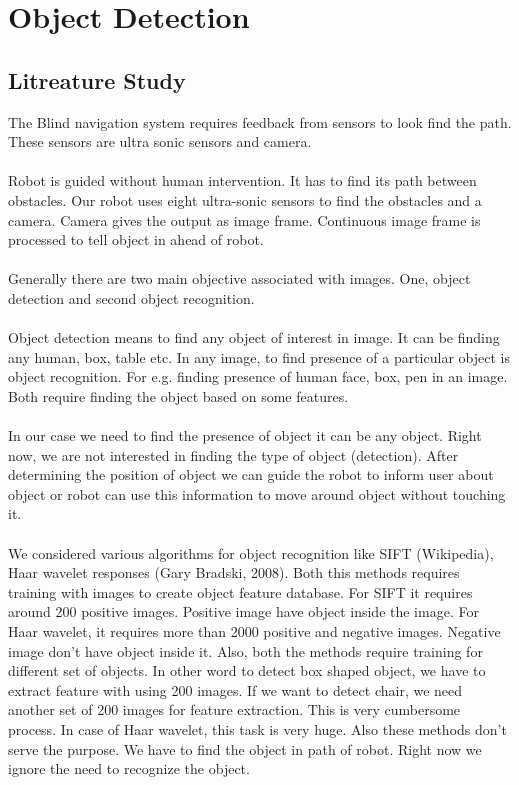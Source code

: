 \documentclass[12pt]{article}
\begin{document}
\section{Object Detection}
\subsection{Litreature Study}
The Blind navigation system requires feedback from sensors to look find the path. These sensors are ultra sonic sensors and camera.\\
\\
Robot is guided without human intervention. It has to find its path between obstacles. Our robot uses eight ultra-sonic sensors to find the obstacles and a camera. Camera gives the output as image frame. Continuous image frame is processed to tell object in ahead of robot.\\
\\
Generally there are two main objective associated with images. One, object detection and second object recognition.\\
\\
Object detection means to find any object of interest in image. It can be finding any human, box, table etc. In any image, to find presence of a particular object is object recognition. For e.g. finding presence of human face, box, pen in an image. Both require finding the object based on some features.\\
\\
In our case we need to find the presence of object it can be any object. Right now, we are not interested in finding the type of object (detection). After determining the position of object we can guide the robot to inform user about object or robot can use this information to move around object without touching it.\\
\\
We considered various algorithms for object recognition like SIFT (Wikipedia), Haar wavelet responses (Gary Bradski, 2008). Both this methods requires training with images to create object feature database. For SIFT it requires around 200 positive images. Positive image have object inside the image. For Haar wavelet, it requires more than 2000 positive and negative images. Negative image don't have object inside it. Also, both the methods require training for different set of objects. In other word to detect box shaped object, we have to extract feature with using 200 images. If we want to detect chair, we need another set of 200 images for feature extraction. This is very cumbersome process. In case of Haar wavelet, this task is very huge. Also these methods don't serve the purpose. We have to find the object in path of robot. Right now we ignore the need to recognize the object.\\
\\
\end{document}
